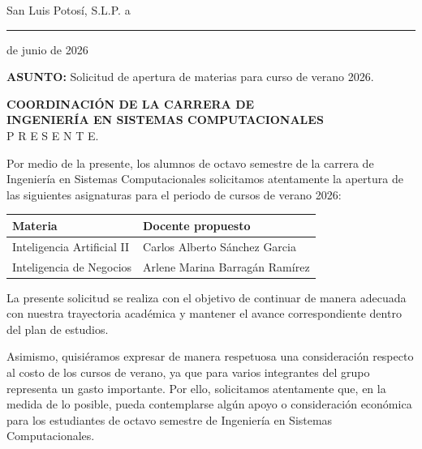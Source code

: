 \documentclass[12pt]{article}
\begin{document}
\begin{flushright}
San Luis Potosí, S.L.P. a \rule{4cm}{0.4pt} de junio de 2026
\end{flushright}

\vspace{1cm}

\textbf{ASUNTO:} Solicitud de apertura de materias para curso de verano 2026.

\vspace{1cm}

\textbf{COORDINACIÓN DE LA CARRERA DE} \\
\textbf{INGENIERÍA EN SISTEMAS COMPUTACIONALES} \\
P R E S E N T E.

\vspace{1cm}

Por medio de la presente, los alumnos de octavo semestre de la carrera de Ingeniería en Sistemas Computacionales solicitamos atentamente la apertura de las siguientes asignaturas para el periodo de cursos de verano 2026:

\vspace{0.5cm}

\begin{center}
\begin{tabular}{|>{\centering\arraybackslash}m{7cm}|>{\centering\arraybackslash}m{6cm}|}
\hline
\textbf{Materia} & \textbf{Docente propuesto} \\
\hline
Inteligencia Artificial II & Carlos Alberto Sánchez Garcia \\
\hline
Inteligencia de Negocios & Arlene Marina Barragán Ramírez \\
\hline
\end{tabular}
\end{center}

\vspace{0.8cm}

La presente solicitud se realiza con el objetivo de continuar de manera adecuada con nuestra trayectoria académica y mantener el avance correspondiente dentro del plan de estudios.

Asimismo, quisiéramos expresar de manera respetuosa una consideración respecto al costo de los cursos de verano, ya que para varios integrantes del grupo representa un gasto importante. Por ello, solicitamos atentamente que, en la medida de lo posible, pueda contemplarse algún apoyo o consideración económica para los estudiantes de octavo semestre de Ingeniería en Sistemas Computacionales.
\end{document}
